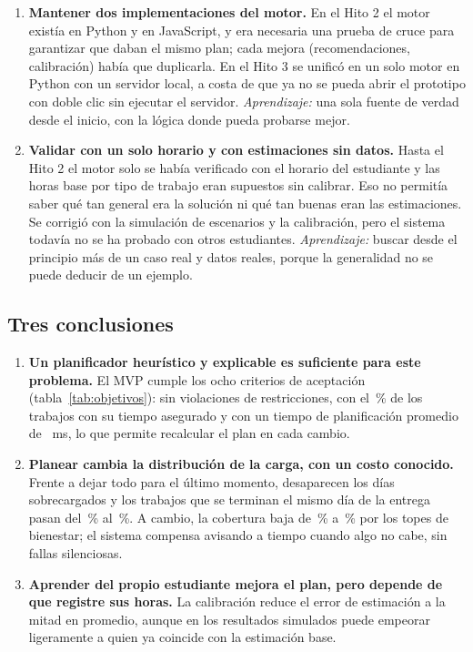 \begin{enumerate}
    \item \textbf{Mantener dos implementaciones del motor.} En el Hito 2 el motor existía en Python y en JavaScript, y era necesaria una prueba de cruce para garantizar que daban el mismo plan; cada mejora (recomendaciones, calibración) había que duplicarla. En el Hito 3 se unificó en un solo motor en Python con un servidor local, a costa de que ya no se pueda abrir el prototipo con doble clic sin ejecutar el servidor. \emph{Aprendizaje:} una sola fuente de verdad desde el inicio, con la lógica donde pueda probarse mejor.
    \item \textbf{Validar con un solo horario y con estimaciones sin datos.} Hasta el Hito 2 el motor solo se había verificado con el horario del estudiante y las horas base por tipo de trabajo eran supuestos sin calibrar. Eso no permitía saber qué tan general era la solución ni qué tan buenas eran las estimaciones. Se corrigió con la simulación de escenarios y la calibración, pero el sistema todavía no se ha probado con otros estudiantes. \emph{Aprendizaje:} buscar desde el principio más de un caso real y datos reales, porque la generalidad no se puede deducir de un ejemplo.
\end{enumerate}

\subsection{Tres conclusiones}

\begin{enumerate}
    \item \textbf{Un planificador heurístico y explicable es suficiente para este problema.} El MVP cumple los ocho criterios de aceptación (tabla~\ref{tab:objetivos}): sin violaciones de restricciones, con el \resPctCub\,\% de los trabajos con su tiempo asegurado y con un tiempo de planificación promedio de \resMsMedia\ ms, lo que permite recalcular el plan en cada cambio.
    \item \textbf{Planear cambia la distribución de la carga, con un costo conocido.} Frente a dejar todo para el último momento, desaparecen los días sobrecargados y los trabajos que se terminan el mismo día de la entrega pasan del \resColUlt\,\% al \resColEdf\,\%. A cambio, la cobertura baja de \resPctCubUlt\,\% a \resPctCub\,\% por los topes de bienestar; el sistema compensa avisando a tiempo cuando algo no cabe, sin fallas silenciosas.
    \item \textbf{Aprender del propio estudiante mejora el plan, pero depende de que registre sus horas.} La calibración reduce el error de estimación a la mitad en promedio, aunque en los resultados simulados puede empeorar ligeramente a quien ya coincide con la estimación base.
\end{enumerate}

